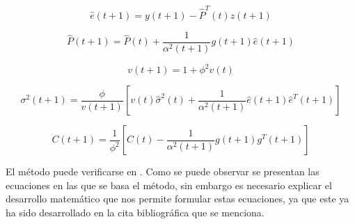 \begin{equation}
\hat e(t + 1) = y(t + 1) - \hat P^T (t)z(t + 1)
\label{eq61}
\end{equation}

\begin{equation}
\hat P(t + 1) = \hat P(t) + \frac{1}{{\alpha ^2 (t + 1)}}g(t + 1)\hat e(t + 1)
\label{eq62}
\end{equation}

\begin{equation}
v(t + 1) = 1 + \phi ^2 v(t)
\label{eq63}
\end{equation}

\begin{equation}
\sigma ^2 (t + 1) = \frac{\phi }{{v(t + 1)}}\left[ {v(t)\hat \sigma ^2 (t) + \frac{1}{{\alpha ^2 (t + 1)}}\hat e(t + 1)\hat e^T (t + 1)} \right]
\label{eq64}
\end{equation}

\begin{equation}
C(t + 1) = \frac{1}{{\phi ^2 }}\left[ {C(t) - \frac{1}{{\alpha ^2 (t + 1)}}g(t + 1)g^T (t + 1)} \right]
\label{eq65}
\end{equation}

El método puede verificarse en \cite{aguado}. Como se puede observar se presentan las ecuaciones en las que se basa el método, sin embargo es necesario explicar el desarrollo matemático que nos permite formular estas ecuaciones, ya que este ya ha sido desarrollado en la cita bibliográfica que se menciona.  